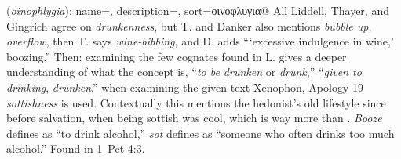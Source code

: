 \item[Wine alcoholic,]

(\textit{oinophlygia}):
{
    name=,
    description={},
    sort=οινοφλυγια@
}
All Liddell, Thayer, and Gingrich agree on \emph{drunkenness}, but T. and Danker also mentions \emph{bubble up}, \emph{overflow}, then T. says \emph{wine-bibbing}, and D. adds ```excessive indulgence in wine,' boozing.''
Then: examining the few cognates found in L. gives a deeper understanding of what the concept is,  ``\emph{to be drunken} or \emph{drunk},''  ``\emph{given to drinking}, \emph{drunken}.''
when examining the given text Xenophon, Apology 19 \emph{sottishness} is used.
Contextually this mentions the hedonist's old lifestyle since before salvation, when being sottish was cool, which is way more than . \emph{Booze} defines as ``to drink alcohol,'' \emph{sot} defines as ``someone who often drinks too much alcohol.''
Found in 1~Pet 4:3.
